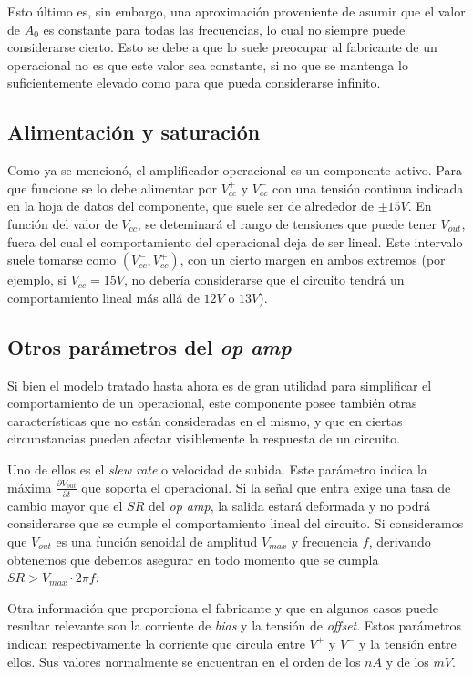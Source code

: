 \documentclass[main.tex]{subfiles}
\begin{document}
 Esto \'ultimo es, sin embargo, una aproximaci\'on proveniente de asumir que el valor de $A_0$ es constante para todas las frecuencias, lo cual no siempre puede considerarse cierto. Esto se debe a que lo suele preocupar al fabricante de un operacional no es que este valor sea constante, si no que se mantenga lo suficientemente elevado como para que pueda considerarse infinito. \par


\subsection{Alimentaci\'on y saturaci\'on}
Como ya se mencion\'o, el amplificador operacional es un componente activo. Para que funcione se lo debe alimentar por $V_{cc}^+$ y $V_{cc}^-$ con una tensi\'on continua indicada en la hoja de datos del componente, que suele ser de alrededor de $\pm 15V$. En funci\'on del valor de $V_{cc}$, se deteminar\'a el rango de tensiones que puede tener $V_{out}$, fuera del cual el comportamiento del operacional deja de ser lineal. Este intervalo suele tomarse como $(V_{cc}^-, V_{cc}^+)$, con un cierto margen en ambos extremos (por ejemplo, si $V_{cc}=15V$, no deber\'ia considerarse que el circuito tendr\'a un comportamiento lineal m\'as all\'a de $12V$ o $13V$).



\subsection{Otros par\'ametros del \textit{op amp}}
Si bien el modelo tratado hasta ahora es de gran utilidad para simplificar el comportamiento de un operacional, este componente posee tambi\'en otras caracter\'isticas que no est\'an consideradas en el mismo, y que en ciertas circunstancias pueden afectar visiblemente la respuesta de un circuito.\par

Uno de ellos es el \textit{slew rate} o velocidad de subida. Este par\'ametro indica la m\'axima $\frac{\partial V_{out}}{\partial t}$ que soporta el operacional. Si la se\~nal que entra exige una tasa de cambio mayor que el $SR$ del \textit{op amp}, la salida estar\'a deformada y no podr\'a considerarse que se cumple el comportamiento lineal del circuito. Si consideramos que $V_{out}$ es una funci\'on senoidal de amplitud $V_{max}$ y frecuencia $f$, derivando obtenemos que debemos asegurar en todo momento que se cumpla $SR > V_{max} \cdot 2\pi f$. \par

Otra informaci\'on que proporciona el fabricante y que en algunos casos puede resultar relevante son la corriente de \textit{bias} y la tensi\'on de \textit{offset}. Estos par\'ametros indican respectivamente la corriente que circula entre $V^+$ y $V^-$ y la tensi\'on entre ellos. Sus valores normalmente se encuentran en el orden de los $nA$ y de los $mV$. \par

 
\end{document}
